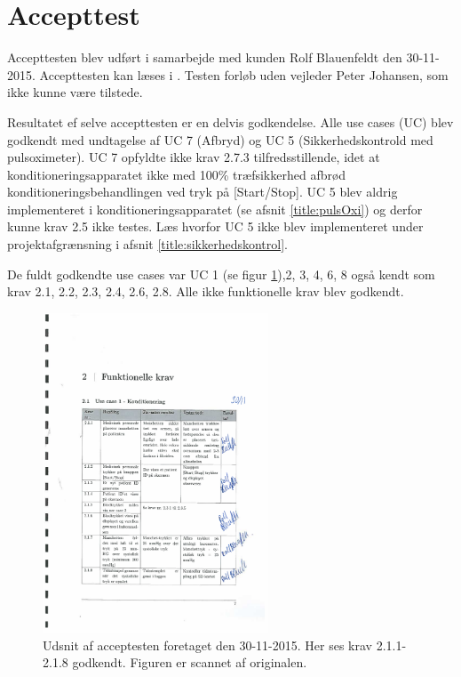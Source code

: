 \section{Accepttest}\label{title:accepttest}
Accepttesten blev udført i samarbejde med kunden Rolf Blauenfeldt den 30-11-2015. Accepttesten kan læses i . Testen forløb uden vejleder Peter Johansen, som ikke kunne være tilstede.

Resultatet ef selve accepttesten er en delvis godkendelse. Alle use cases (UC) blev godkendt med undtagelse af UC 7 (Afbryd) og UC 5 (Sikkerhedskontrold med pulsoximeter). UC 7 opfyldte ikke krav 2.7.3 tilfredsstillende, idet at konditioneringsapparatet ikke med 100\% træfsikkerhed afbrød konditioneringsbehandlingen ved tryk på [Start/Stop]. UC 5 blev aldrig implementeret i konditioneringsapparatet (se afsnit \ref{title:pulsOxi}) og derfor kunne krav 2.5 ikke testes. Læs hvorfor UC 5 ikke blev implementeret under projektafgrænsning i afsnit \ref{title:sikkerhedskontrol}.

De fuldt godkendte use cases var UC 1 (se figur \ref{fig:udsnitAfAccepttest}),2, 3, 4, 6, 8 også kendt som krav 2.1, 2.2, 2.3, 2.4, 2.6, 2.8. Alle ikke funktionelle krav blev godkendt. 

\begin{figure}[H]
	\centering
	\includegraphics[width=0.6\textwidth]{billeder/udsnitAfAccepttest.pdf}
	\caption{Udsnit af acceptesten foretaget den 30-11-2015. Her ses krav 2.1.1-2.1.8 godkendt. Figuren er scannet af originalen.}\label{fig:udsnitAfAccepttest}
\end{figure}
